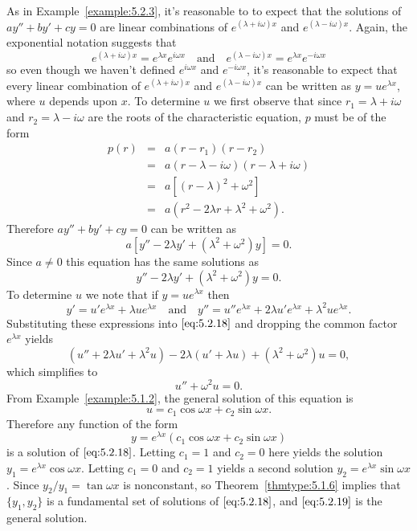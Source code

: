 \documentclass{ximera}
\begin{document}
As in Example~\ref{example:5.2.3}, it's reasonable to
to expect that the solutions of $ay''+by'+cy=0$  are linear
combinations of
$e^{(\lambda+i\omega)x}$ and $e^{(\lambda-i\omega)x}$.
Again,  the exponential notation suggests that
$$
e^{(\lambda+i\omega)x}=e^{\lambda x}e^{i\omega x}\quad\mbox{and}\quad e^{(\lambda-i\omega)x}=e^{\lambda x}e^{-i\omega x}
$$
so even though we haven't defined $e^{i\omega x}$ and
$e^{-i\omega x}$, it's reasonable to expect that every linear
combination of $e^{(\lambda+i\omega)x}$ and $e^{(\lambda-i\omega)x}$
can  be written as
$y=ue^{\lambda x}$, where $u$ depends upon $x$.
To determine $u$ we first observe that since $r_1=\lambda+i\omega$
and $r_2=\lambda-i\omega$ are the roots of the characteristic
equation,  $p$ must be of  the form
$$
\begin{array}{ccl}
p(r)&=&a(r-r_1)(r-r_2)\\
&=&a(r-\lambda-i\omega)(r-\lambda+i\omega)\\
&=& a \left[(r-\lambda)^2+\omega^2\right]\\
&=&a(r^2-2\lambda r +\lambda^2+\omega^2).
\end{array}
$$
Therefore $ay''+by'+cy=0$ can be written as
$$
a\left[y''-2\lambda y'+(\lambda^2+\omega^2)y\right]=0.
$$
 Since $a\neq 0$
this equation has the same solutions as
\begin{equation} \label{eq:5.2.18}
y''-2\lambda y'+(\lambda^2+\omega^2)y=0.
\end{equation}
 To determine $u$ we note
that if $y=ue^{\lambda x}$ then
$$
y'=u'e^{\lambda x}+\lambda ue^{\lambda x}\quad\mbox{and}\quad
y''=u''e^{\lambda x}+2\lambda u'e^{\lambda x}+\lambda^2ue^{\lambda x}.
$$
Substituting these expressions  into
$\eqref{eq:5.2.18}$ and dropping the common factor $e^{\lambda x}$ yields
$$
(u''+2\lambda u'+\lambda^2 u)-2\lambda(u'+\lambda u)
+(\lambda^2+\omega^2)u=0,
$$
which simplifies to
$$
u''+\omega^2 u=0.
$$
From Example~\ref{example:5.1.2}, the  general solution of this
equation is
$$
u=c_1\cos\omega x +c_2\sin\omega x.
$$
 Therefore any function of the form
\begin{equation} \label{eq:5.2.19}
y=e^{\lambda x}(c_1\cos\omega x+c_2\sin\omega x)
\end{equation}
is  a solution of $\eqref{eq:5.2.18}$.
Letting $c_1=1$ and $c_2=0$ here yields the solution
 $y_1=e^{\lambda x}\cos\omega x$. Letting $c_1=0$ and $c_2=1$
yields a second solution $y_2=e^{\lambda x}\sin\omega x$. Since
$y_2/y_1=\tan\omega x$
is nonconstant, so  Theorem~\ref{thmtype:5.1.6} implies that
$\{y_1,y_2\}$ is
a fundamental set of solutions of $\eqref{eq:5.2.18}$, and $\eqref{eq:5.2.19}$
is the general solution.
 
\end{document}
